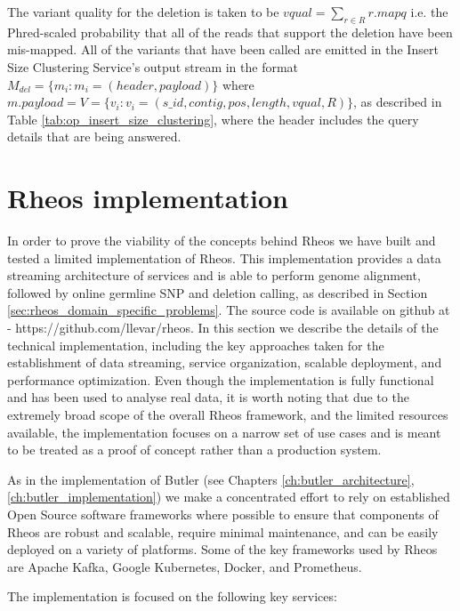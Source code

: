 The variant quality for the deletion is taken to be $vqual = \sum_{r \in R}{r.mapq}$ i.e. the Phred-scaled probability that all of the reads that support the deletion have been mis-mapped. All of the variants that have been called are emitted in the Insert Size Clustering Service's output stream in the format $M_{del} = \{m_i: m_i = (header, payload)\}$ where $m.payload = V = \{v_i: v_i = (s\_id, contig, pos, length, vqual, R)\}$, as described in Table \ref{tab:op_insert_size_clustering}, where the header includes the query details that are being answered.


\section{Rheos implementation}\label{sec:rheos_implementation}

In order to prove the viability of the concepts behind Rheos we have built and tested a limited implementation of Rheos. This implementation provides a data streaming architecture of services and is able to perform genome alignment, followed by online germline SNP and deletion calling, as described in Section \ref{sec:rheos_domain_specific_problems}. The source code is available on github at - https://github.com/llevar/rheos. In this section we describe the details of the technical implementation, including the key approaches taken for the establishment of data streaming, service organization, scalable deployment, and performance optimization. Even though the implementation is fully functional and has been used to analyse real data, it is worth noting that due to the extremely broad scope of the overall Rheos framework, and the limited resources available, the implementation focuses on a narrow set of use cases and is meant to be treated as a proof of concept rather than a production system.

As in the implementation of Butler (see Chapters \ref{ch:butler_architecture}, \ref{ch:butler_implementation}) we make a concentrated effort to rely on established Open Source software frameworks where possible to ensure that components of Rheos are robust and scalable, require minimal maintenance, and can be easily deployed on a variety of platforms. Some of the key frameworks used by Rheos are Apache Kafka, Google Kubernetes, Docker, and Prometheus.

The implementation is focused on the following key services:

